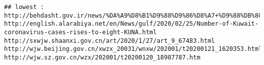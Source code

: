 \documentclass[
]{article}
\begin{document}
\begin{verbatim}
## lowest : http://behdasht.gov.ir/news/%DA%A9%D8%B1%D9%88%D9%86%D8%A7+%D9%88%DB%8C%D8%B1%D9%88%D8%B3/199807/%D8%AF%D8%B1+%D8%B1%D9%88%D8%B2%D9%87%D8%A7%DB%8C+%DA%AF%D8%B0%D8%B4%D8%AA%D9%87+735+%D8%A8%DB%8C%D9%85%D8%A7%D8%B1+%D8%A8%D8%A7+%D8%B9%D9%84%D8%A7%D8%A6%D9%85+%D8%B4%D8%A8%D9%87+%D8%A2%D9%86%D9%81%D9%84%D9%88%D8%A2%D9%86%D8%B2%D8%A7+%D8%AF%D8%B1+%DA%A9%D8%B4%D9%88%D8%B1+%D8%A8%D8%B3%D8%AA%D8%B1%DB%8C+%D8%B4%D8%AF%D9%86%D8%AF+%D8%A8%D8%B1+%D8%A7%D8%B3%D8%A7%D8%B3+%D8%A2%D8%AE%D8%B1%DB%8C%D9%86+%D9%86%D8%AA%D8%A7%DB%8C%D8%AC+%D8%A2%D8%B2%D9%85%D8%A7%DB%8C%D8%B4+%D9%87%D8%A7+%D8%A7%D8%A8%D8%AA%D9%84%D8%A7%DB%8C+13+%D9%85%D9%88%D8%B1%D8%AF+%D8%AF%DB%8C%DA%AF%D8%B1+%D8%A8%D9%87+%DA%A9%D9%88%D9%88%DB%8C%D8%AF19+%D9%82%D8%B7%D8%B9%DB%8C+%D8%A8%D9%87+%D9%86%D8%B8%D8%B1+%D9%85%DB%8C+%D8%B1%D8%B3%D8%AF http://english.alarabiya.net/en/News/gulf/2020/02/25/Number-of-Kuwait-coronavirus-cases-rises-to-eight-KUNA.html                                                                                                                                                                                                                                                                                                                                                                                                                                                                                                                                                                                                                                                                                                                http://sxwjw.shaanxi.gov.cn/art/2020/1/27/art_9_67483.html                                                                                                                                                                                                                                                                                                                                                                                                                                                                                                                                                                                                                                                                                                                                                                      http://wjw.beijing.gov.cn/xwzx_20031/wnxw/202001/t20200121_1620353.html                                                                                                                                                                                                                                                                                                                                                                                                                                                                                                                                                                                                                                                                                                                                                         http://wjw.sz.gov.cn/wzx/202001/t20200120_18987787.htm                                                     
\end{verbatim}
\end{document}
